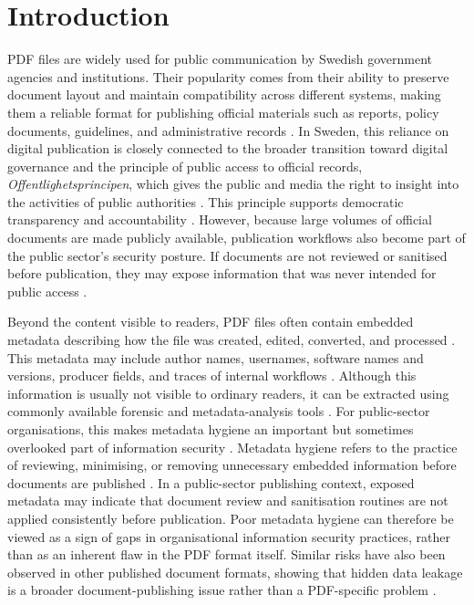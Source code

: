 \documentclass[conference]{IEEEtran}
\begin{document}
\section{Introduction} %
PDF files are widely used for public communication by Swedish government agencies and institutions. Their popularity comes from their ability to preserve document layout and maintain compatibility across different systems, making them a reliable format for publishing official materials such as reports, policy documents, guidelines, and administrative records \cite{iso32000}. In Sweden, this reliance on digital publication is closely connected to the broader transition toward digital governance and the principle of public access to official records, \textit{Offentlighetsprincipen}, which gives the public and media the right to insight into the activities of public authorities \cite{swe_public_access}. This principle supports democratic transparency and accountability \cite{swe_public_access}. However, because large volumes of official documents are made publicly available, publication workflows also become part of the public sector’s security posture. If documents are not reviewed or sanitised before publication, they may expose information that was never intended for public access \cite{nsa2008}.

Beyond the content visible to readers, PDF files often contain embedded metadata describing how the file was created, edited, converted, and processed \cite{nsa2008}. This metadata may include author names, usernames, software names and versions, producer fields, and traces of internal workflows \cite{hasegawa2022}. Although this information is usually not visible to ordinary readers, it can be extracted using commonly available forensic and metadata-analysis tools \cite{feng2018}. For public-sector organisations, this makes metadata hygiene an important but sometimes overlooked part of information security \cite{skrauca2026}. Metadata hygiene refers to the practice of reviewing, minimising, or removing unnecessary embedded information before documents are published \cite{spiegel2017}. In a public-sector publishing context, exposed metadata may indicate that document review and sanitisation routines are not applied consistently before publication. Poor metadata hygiene can therefore be viewed as a sign of gaps in organisational information security practices, rather than as an inherent flaw in the PDF format itself. Similar risks have also been observed in other published document formats, showing that hidden data leakage is a broader document-publishing issue rather than a PDF-specific problem \cite{byers2004}.
\end{document}
